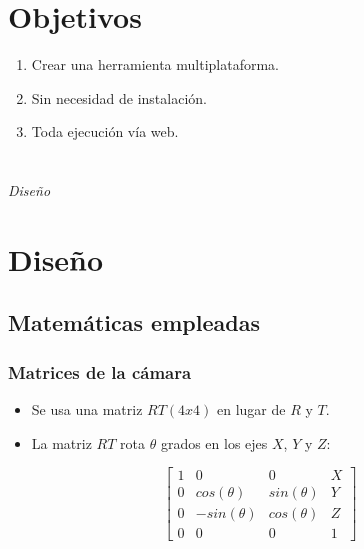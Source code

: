 \documentclass{beamer}
\begin{document}
\section{Objetivos}
\begin{frame}
\begin{enumerate}
\item Crear una herramienta multiplataforma.
\item Sin necesidad de instalación.
\item Toda ejecución vía web.
\end{enumerate}
\end{frame}

\section*{}
\begin{frame}{}
  \centering \Huge
  \emph{Diseño}
\end{frame}

\section{Diseño}
\subsection{Matemáticas empleadas}
\begin{frame}
\frametitle{Matrices de la cámara}
\begin{itemize}
\item Se usa una matriz $RT (4x4)$ en lugar de $R$ y $T$.
\item La matriz $RT$ rota $\theta$ grados en los ejes $X$, $Y$ y $Z$:
\end{itemize}
\begin{equation}
	\begin{bmatrix}
	1 & 0 & 0 & X \\
	0 & cos(\theta) & sin(\theta) &	Y \\
	0 & -sin(\theta)& cos(\theta) & Z \\
	0 & 0 & 0 & 1 
	\end{bmatrix}
\end{equation}
\end{frame}
\end{document}
